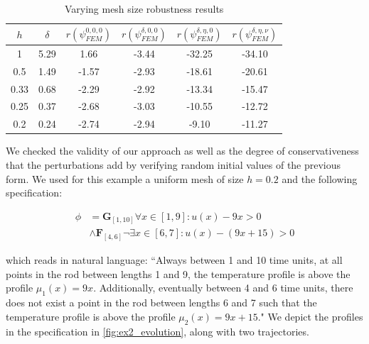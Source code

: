 \documentclass[letterpaper, 10 pt, conference]{ieeeconf/ieeeconf}
\newcommand{\Always}{\mathbf{G}}
\newcommand{\Event}{\mathbf{F}}
\begin{document}
\begin{table}
\centering
\caption{Varying mesh size robustness results}
\label{tab:res_meshes}
\begin{tabular}{|c|c|c|c|c|c|}
    \hline
    $h$ & $\delta$ & $r(\psi_{FEM}^{0, 0, 0})$ & $r(\psi_{FEM}^{\delta, 0, 0})$ &
    $r(\psi_{FEM}^{\delta, \eta, 0})$ & $r(\psi_{FEM}^{\delta, \eta,
\nu})$ \\
    \hline
    1 & 5.29 & 1.66 & -3.44 & -32.25 & -34.10 \\
    0.5 & 1.49 & -1.57 & -2.93 & -18.61 & -20.61 \\
    0.33 & 0.68 & -2.29 & -2.92 & -13.34 & -15.47 \\
    0.25 & 0.37 & -2.68 & -3.03 & -10.55 & -12.72 \\
    0.2 & 0.24 & -2.74 & -2.94 & -9.10 & -11.27 \\
    \hline
\end{tabular}
\end{table}

We checked the validity of our approach as well as the degree of
conservativeness that the perturbations add by verifying random initial values
of the previous form. We used for this example a uniform mesh of size $h = 0.2$
and the following specification: 

\begin{equation}
    \begin{aligned}
        \phi &= \Always_{[1, 10]} \forall x \in [1, 9]: u(x) - 9x > 0 \\
        &\wedge \Event_{[4, 6]} \lnot \exists x \in [6, 7]: u(x) - (9x + 15) > 0
\end{aligned}
\end{equation}

which reads in natural language: ``Always between 1 and 10 time units, at all
points in the rod between lengths 1 and 9, the temperature profile is above the
profile $\mu_1(x) = 9x$. Additionally, eventually between 4 and 6 time units,
there does not exist a point in the rod between lengths 6 and 7 such that the
temperature profile is above the profile $\mu_2(x) = 9x + 15$." We depict the
profiles in the specification in \cref{fig:ex2_evolution}, along with two
trajectories.
\end{document}
